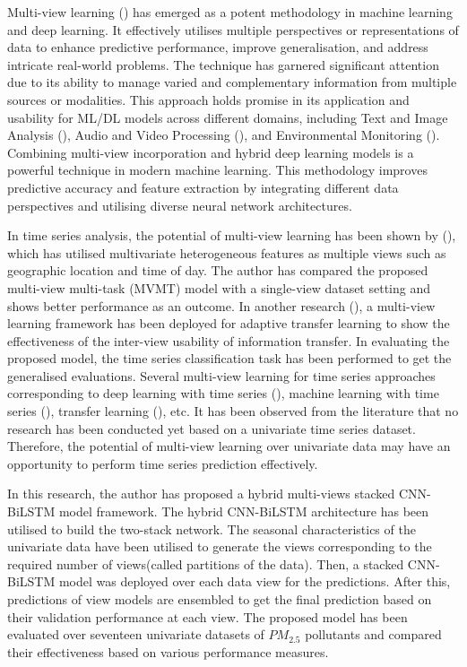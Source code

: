 \documentclass[a4paper, fleqn]{cas-sc}
\theoremstyle{definition}
\theoremstyle{remark}
\begin{document}
\par Multi-view learning (\cite{zhao2017multi, xu2013survey}) has emerged as a potent methodology in machine learning and deep learning. It effectively utilises multiple perspectives or representations of data to enhance predictive performance,  improve generalisation,  and address intricate real-world problems. The technique has garnered significant attention due to its ability to manage varied and complementary information from multiple sources or modalities. This approach holds promise in its application and usability for ML/DL models across different domains,  including Text and Image Analysis (\cite{yang2020image, nie2017auto,YAN2021106, KUMAR2023101959,}),  Audio and Video Processing (\cite{garcia2018multi, hussain2021comprehensive, YAN2021106, KUMAR2023101959,}),  and Environmental Monitoring (\cite{huang2017multi}). Combining multi-view incorporation and hybrid deep learning models is a powerful technique in modern machine learning. This methodology improves predictive accuracy and feature extraction by integrating different data perspectives and utilising diverse neural network architectures. 
\par In time series analysis, the potential of multi-view learning has been shown by  (\cite{9935292}), which has utilised multivariate heterogeneous features as multiple views such as geographic location and time of day. The author has compared the proposed multi-view multi-task (MVMT) model with a single-view dataset setting and shows better performance as an outcome. In another research (\cite{atl2013mts}), a multi-view learning framework has been deployed for adaptive transfer learning to show the effectiveness of the inter-view usability of information transfer. In evaluating the proposed model, the time series classification task has been performed to get the generalised evaluations. Several multi-view learning for time series approaches corresponding to deep learning with time series (\cite{mgtl2019tsc,vaw2019dtltsc}), machine learning with time series (\cite{vaw2019dtltsc}), transfer learning (\cite{mgtl2019tsc, 9935292}), etc. It has been observed from the literature that no research has been conducted yet based on a univariate time series dataset. Therefore, the potential of multi-view learning over univariate data may have an opportunity to perform time series prediction effectively.
\par In this research, the author has proposed a hybrid multi-views stacked CNN-BiLSTM model framework. The hybrid CNN-BiLSTM architecture has been utilised to build the two-stack network. The seasonal characteristics of the univariate data have been utilised to generate the views corresponding to the required number of views(called partitions of the data). Then, a stacked CNN-BiLSTM model was deployed over each data view for the predictions. After this, predictions of view models are ensembled to get the final prediction based on their validation performance at each view. The proposed model has been evaluated over seventeen univariate datasets of $PM_{2.5}$ pollutants and compared their effectiveness based on various performance measures.  
\end{document}
